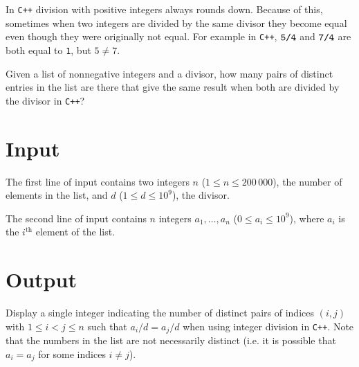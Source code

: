 
In \texttt{C++} division with positive integers always rounds down.  Because of this, sometimes when two integers are
divided by the same divisor they become equal even though they were
originally not equal. For example in \texttt{C++}, $\verb|5/4|$ and
$\verb|7/4|$ are both equal to \verb|1|, but $5 \neq 7$.

Given a list of nonnegative integers and a divisor, how many pairs of
distinct entries in the list are there that give the same result when
both are divided by the divisor in \texttt{C++}?

\section*{Input}

The first line of input contains two integers $n$ ($1 \leq n \leq 200\,000$), the
number of elements in the list, and $d$ ($1 \leq d \leq 10^9$), the divisor. 

The second line of input contains $n$ integers $a_1, \ldots, a_n$ ($0 \leq a_i \leq 10^9$),
where $a_i$ is the $i^\textrm{th}$ element of the list.

\section*{Output}
Display a single integer indicating the number of distinct pairs of indices $(i,j)$ with 
$1 \leq i < j \leq n$ such that $a_i / d = a_j / d$ when using integer division
in \texttt{C++}. Note that the numbers in the list are not necessarily distinct 
(i.e. it is possible that $a_i = a_j$ for some indices $i \neq j$).
